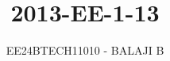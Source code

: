\documentclass[journal]{IEEEtran}
\begin{document}

\vspace{3cm}

\title{2013-EE-1-13}
\author{EE24BTECH11010 - BALAJI B}
{\let\newpage\relax\maketitle}

\renewcommand{\thefigure}{\theenumi}
\renewcommand{\thetable}{\theenumi}
\setlength{\intextsep}{10pt} %


\renewcommand{\thetable}{\theenumi}
\end{document}
